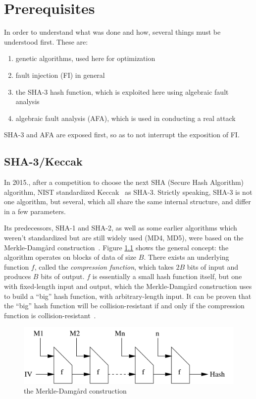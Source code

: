 \documentclass[times, utf8, diplomski]{fer}
\begin{document}
\chapter{Prerequisites}\label{ch:prerequisites}
In order to understand what was done and how, several things must be understood
first. These are:
\begin{enumerate}
    \item genetic algorithms, used here for optimization
    \item fault injection (FI) in general
    \item the SHA-3 hash function, which is exploited here using algebraic fault analysis
    \item algebraic fault analysis (AFA), which is used in conducting a real attack
\end{enumerate}

SHA-3 and AFA are exposed first, so as to not interrupt the exposition of FI.


\section{SHA-3/Keccak}\label{sec:keccak}
In 2015., after a competition to choose the next SHA (Secure Hash Algorithm)
algorithm, NIST standardized Keccak~\cite{keccak_reference} as SHA-3.
Strictly speaking, SHA-3 is not one algorithm, but several, which all share
the same internal structure, and differ in a few parameters.

Its predecessors, SHA-1 and SHA-2, as well as some earlier algorithms which
weren't standardized but are still widely used (MD4, MD5), were based on the
Merkle-Damgård construction~\cite{merkle-damgard_revisited}. Figure \ref{fig:merkle-damgard}
shows the general concept: the algorithm operates on blocks of data of size $B$.
There exists an underlying function $f$, called the \emph{compression function},
which takes $2B$ bits of input and produces $B$ bits of output. $f$ is essentially
a small hash function itself, but one with fixed-length input and output, which
the Merkle-Damgård construction uses to build a ``big'' hash function, with
arbitrary-length input. It can be proven that the ``big'' hash function will
be collision-resistant if and only if the compression function is
collision-resistant~\cite{merkle-damgard_security}.

\begin{figure}[htb]\label{fig:merkle-damgard}
    \centering
    \includegraphics{images/merkle-damgard.png}
    \caption{the Merkle-Damgård construction}
    \label{fig:merkle-damgard}
\end{figure}
\end{document}

